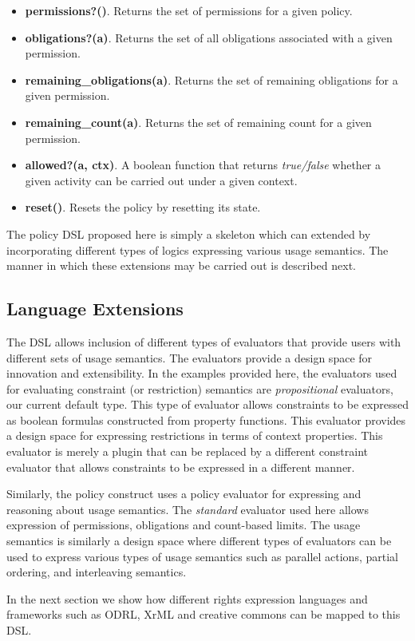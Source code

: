 \begin{itemize}
\item {\bf permissions?()}. Returns the set of permissions for a given policy.
\item {\bf obligations?(a)}. Returns the set of all obligations associated with a given permission. 
\item {\bf remaining\_obligations(a)}. Returns the set of remaining obligations for a given permission. 
\item {\bf remaining\_count(a)}. Returns the set of remaining count for a given permission. 
\item {\bf allowed?(a, ctx)}. A boolean function that returns {\em true/false} whether a given activity can be carried out under a given context. 
\item {\bf reset()}. Resets the policy by resetting its state. 
\end{itemize}

The policy DSL proposed here is simply a skeleton which can extended by incorporating different types of logics expressing various usage semantics. The manner in which these extensions may be carried out is described next. 

\subsection{Language Extensions}

The DSL allows inclusion of different types of evaluators that provide users with different sets of usage semantics. The evaluators provide a design space for innovation and extensibility. In the examples provided here, the evaluators used for evaluating constraint (or restriction) semantics are {\em propositional} evaluators, our current default type. This type of evaluator allows constraints to be expressed as boolean formulas constructed from property functions. This evaluator provides a design space for expressing restrictions in terms of context properties. This evaluator is merely a plugin that can be replaced by a different constraint evaluator that allows constraints to be expressed in a different manner. 

Similarly, the policy construct uses a policy evaluator for expressing and reasoning about usage semantics. The {\em standard} evaluator used here allows expression of permissions, obligations and count-based limits. The usage semantics is similarly a design space where different types of evaluators can be used to express various types of usage semantics such as parallel actions, partial ordering, and interleaving semantics.

In the next section we show how different rights expression languages and frameworks such as ODRL, XrML and creative commons can be mapped to this DSL. 